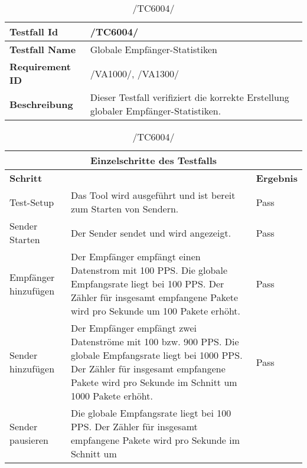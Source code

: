     \begin{table}[h]
        \caption{/TC6004/}
        \label{tab:TC6004}
        \begin{center}
            \begin{tabular}{|p{3.5cm}|p{12cm}|}
                \hline
                    \textbf{Testfall Id} & /TC6004/\\
                \hline
                    \textbf{Testfall Name} & Globale Empfänger-Statistiken\\
                \hline
                    \textbf{Requirement ID} & /VA1000/, /VA1300/\\
                \hline
                    \textbf{Beschreibung} & Dieser Testfall verifiziert die
                    korrekte Erstellung globaler Empfänger-Statistiken.\\
                \hline
            \end{tabular}
            \begin{tabular}{|p{2.5cm}|p{7.55cm}|p{5cm}|}
                \multicolumn{3}{|c|}{\textbf{Einzelschritte des Testfalls}} \\
                \hline
                    \textbf{Schritt} &  & \textbf{Ergebnis}\\
                \hline
                    Test-Setup & Das Tool
                    wird ausgeführt und ist bereit zum Starten von Sendern. &
                    Pass\\
                \hline
                    Sender Starten & Der
                    Sender sendet und wird angezeigt. & Pass\\
                \hline
                    Empfänger hinzufügen &
                    Der Empfänger empfängt einen Datenstrom mit 100 PPS. Die
                    globale Empfangsrate liegt bei 100 PPS. Der Zähler für
                    insgesamt empfangene Pakete wird pro Sekunde um 100
                    Pakete erhöht. & Pass\\
                \hline
                    Sender hinzufügen & Der Empfänger empfängt zwei Datenströme
                    mit 100 bzw. 900 PPS. Die globale Empfangsrate liegt bei 1000 PPS. Der Zähler für
                    insgesamt empfangene Pakete wird pro Sekunde im Schnitt um
                    1000 Pakete erhöht. & Pass\\
                \hline
                    Sender pausieren & Die globale Empfangsrate liegt bei 100 PPS. Der Zähler für
                    insgesamt empfangene Pakete wird pro Sekunde im Schnitt um

\end{tabular}
\end{center}
\end{table}
